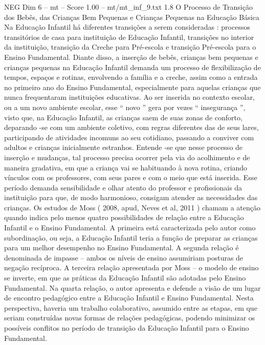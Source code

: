 \begin{textsample}{NEG Dim 6 – mt – Score 1.00 – mt/mt\_inf\_9.txt}  \label{ex:f6_neg_127}
1.8 O Processo de Transição dos Bebês, das Crianças Bem Pequenas e Crianças Pequenas na Educação Básica Na Educação Infantil há diferentes transições a serem consideradas : processos transitórios de casa para instituição de Educação Infantil, transições no interior da instituição, transição da Creche para Pré-escola e transição Pré-escola para o Ensino Fundamental.
Diante disso, a inserção de bebês, crianças bem pequenas e crianças pequenas na Educação Infantil demanda um processo de flexibilização de tempos, espaços e rotinas, envolvendo a família e a creche, assim como a entrada no primeiro ano do Ensino Fundamental, especialmente para aquelas crianças que nunca frequentaram instituições educativas.
Ao ser inserida no contexto escolar, ou a um novo ambiente escolar, esse “ novo ” gera por vezes “ insegurança ”, visto que, na Educação Infantil, as crianças saem de suas zonas de conforto, deparando -se com um ambiente coletivo, com regras diferentes das de seus lares, participando de atividades incomuns ao seu cotidiano, passando a conviver com adultos e crianças inicialmente estranhos.
Entende -se que nesse processo de inserção e mudanças, tal processo precisa ocorrer pela via do acolhimento e de maneira gradativa, em que a criança vai se habituando à nova rotina, criando vínculos com os professores, com seus pares e com o meio que está inserida.
Esse período demanda sensibilidade e olhar atento do professor e profissionais da instituição para que, de modo harmonioso, consigam atender as necessidades das crianças.
Os estudos de Moss ( 2008, apud, Neves et al, 2011 ) chamam a atenção quando indica pelo menos quatro possibilidades de relação entre a Educação Infantil e o Ensino Fundamental.
A primeira está caracterizada pelo autor como subordinação, ou seja, a Educação Infantil teria a função de preparar as crianças para um melhor desempenho no Ensino Fundamental.
A segunda relação é denominada de impasse – ambos os níveis de ensino assumiriam posturas de negação recíproca.
A terceira relação apresentada por Moss – o modelo de ensino se inverte, em que as práticas da Educação Infantil são adotadas pelo Ensino Fundamental.
Na quarta relação, o autor apresenta e defende a visão de um lugar de encontro pedagógico entre a Educação Infantil e Ensino Fundamental.
Nesta perspectiva, haveria um trabalho colaborativo, assumido entre as etapas, em que seriam construídas novas formas de relações pedagógicas, podendo minimizar os possíveis conflitos no período de transição da Educação Infantil para o Ensino Fundamental.

\end{textsample}
